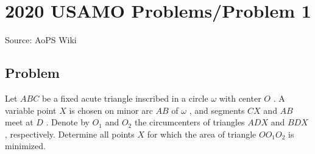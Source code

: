 \documentclass[12pt]{article}
\begin{document}
\section*{{2020 USAMO Problems/Problem 1}}
Source: AoPS Wiki

\subsection*{Problem}
Let $ABC$ be a fixed acute triangle inscribed in a circle $\omega$ with center $O$ . A variable point $X$ is chosen on minor arc $AB$ of $\omega$ , and segments $CX$ and $AB$ meet at $D$ . Denote by $O_1$ and $O_2$ the circumcenters of triangles $ADX$ and $BDX$ , respectively. Determine all points $X$ for which the area of triangle $OO_1O_2$ is minimized.
\end{document}
